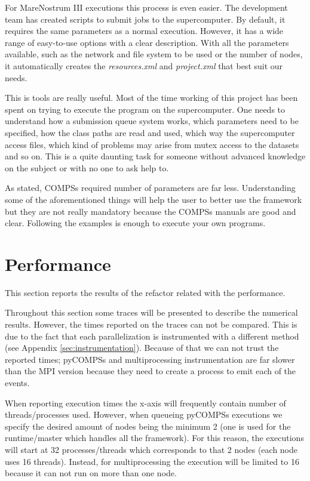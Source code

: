 For MareNostrum III executions this process is even easier. The development team has created scripts to submit jobs to the supercomputer. By default, it requires the same parameters as a normal execution. However, it has a wide range of easy-to-use options with a clear description. With all the parameters available, such as the network and file system to be used or the number of nodes, it automatically creates the \textit{resources.xml} and \textit{project.xml} that best suit our needs. 

This is tools are really useful. Most of the time working of this project has been spent on trying to execute the program on the supercomputer. One needs to understand how a submission queue system works, which parameters need to be specified, how the class paths are read and used, which way the supercomputer access files, which kind of problems may arise from mutex access to the datasets and so on. This is a quite daunting task for someone without advanced knowledge on the subject or with no one to ask help to. 

As stated, COMPSs required number of parameters are far less. Understanding some of the aforementioned things will help the user to better use the framework but they are not really mandatory because the COMPSs manuals are good and clear. Following the examples is enough to execute your own programs. 



\section{Performance}

\label{sec:resperformance}

This section reports the results of the refactor related with the performance. 

Throughout this section some traces will be presented to describe the numerical results. However, the times reported on the traces can not be compared. This is due to the fact that each parallelization is instrumented with a different method (see Appendix \ref{sec:instrumentation}). Because of that we can not trust the reported times; pyCOMPSs and multiprocessing instrumentation are far slower than the MPI version because they need to create a process to emit each of the events.

When reporting execution times the x-axis will frequently contain number of threads/processes used. However, when queueing pyCOMPSs executions we specify the desired amount of nodes being the minimum 2 (one is used for the runtime/master which handles all the framework). For this reason, the executions will start at 32 processes/threads which corresponds to that 2 nodes (each node uses 16 threads). Instead, for multiprocessing the execution will be limited to 16 because it can not run on more than one node.



